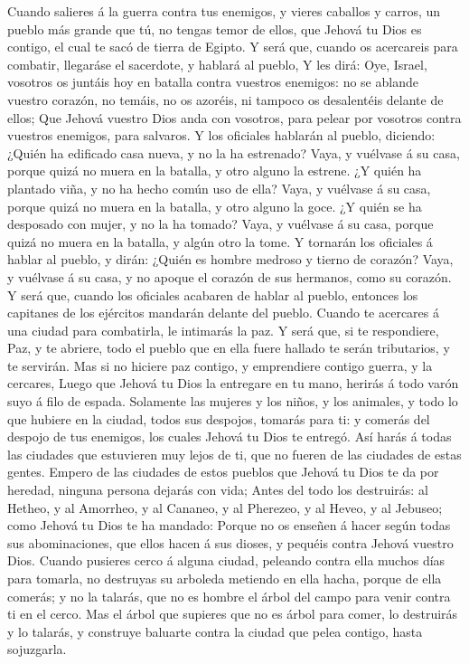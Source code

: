  Cuando salieres á la guerra contra tus enemigos, y vieres
caballos y carros, un pueblo más grande que tú, no tengas temor de
ellos, que Jehová tu Dios es contigo, el cual te sacó de tierra de
Egipto.  Y será que, cuando os acercareis para combatir,
llegaráse el sacerdote, y hablará al pueblo,  Y les dirá:
Oye, Israel, vosotros os juntáis hoy en batalla contra vuestros
enemigos: no se ablande vuestro corazón, no temáis, no os azoréis, ni
tampoco os desalentéis delante de ellos;  Que Jehová vuestro
Dios anda con vosotros, para pelear por vosotros contra vuestros
enemigos, para salvaros.  Y los oficiales hablarán al
pueblo, diciendo: ¿Quién ha edificado casa nueva, y no la ha estrenado?
Vaya, y vuélvase á su casa, porque quizá no muera en la batalla, y otro
alguno la estrene.  ¿Y quién ha plantado viña, y no ha hecho
común uso de ella? Vaya, y vuélvase á su casa, porque quizá no muera en
la batalla, y otro alguno la goce.  ¿Y quién se ha desposado
con mujer, y no la ha tomado? Vaya, y vuélvase á su casa, porque quizá
no muera en la batalla, y algún otro la tome.  Y tornarán
los oficiales á hablar al pueblo, y dirán: ¿Quién es hombre medroso y
tierno de corazón? Vaya, y vuélvase á su casa, y no apoque el corazón de
sus hermanos, como su corazón.  Y será que, cuando los
oficiales acabaren de hablar al pueblo, entonces los capitanes de los
ejércitos mandarán delante del pueblo.  Cuando te acercares
á una ciudad para combatirla, le intimarás la paz.  Y será
que, si te respondiere, Paz, y te abriere, todo el pueblo que en ella
fuere hallado te serán tributarios, y te servirán.  Mas si
no hiciere paz contigo, y emprendiere contigo guerra, y la cercares,
 Luego que Jehová tu Dios la entregare en tu mano, herirás
á todo varón suyo á filo de espada.  Solamente las mujeres
y los niños, y los animales, y todo lo que hubiere en la ciudad, todos
sus despojos, tomarás para ti: y comerás del despojo de tus enemigos,
los cuales Jehová tu Dios te entregó.  Así harás á todas
las ciudades que estuvieren muy lejos de ti, que no fueren de las
ciudades de estas gentes.  Empero de las ciudades de estos
pueblos que Jehová tu Dios te da por heredad, ninguna persona dejarás
con vida;  Antes del todo los destruirás: al Hetheo, y al
Amorrheo, y al Cananeo, y al Pherezeo, y al Heveo, y al Jebuseo; como
Jehová tu Dios te ha mandado:  Porque no os enseñen á hacer
según todas sus abominaciones, que ellos hacen á sus dioses, y pequéis
contra Jehová vuestro Dios.  Cuando pusieres cerco á alguna
ciudad, peleando contra ella muchos días para tomarla, no destruyas su
arboleda metiendo en ella hacha, porque de ella comerás; y no la
talarás, que no es hombre el árbol del campo para venir contra ti en el
cerco.  Mas el árbol que supieres que no es árbol para
comer, lo destruirás y lo talarás, y construye baluarte contra la ciudad
que pelea contigo, hasta sojuzgarla.

